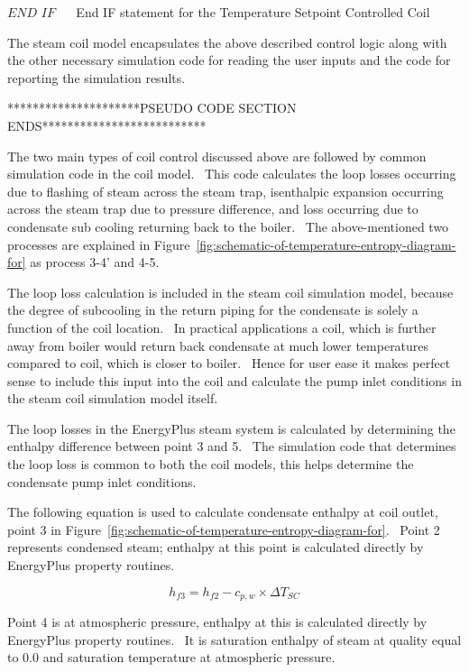 \(END\,\,IF\) ~~ End IF statement for the Temperature Setpoint Controlled Coil

The steam coil model encapsulates the above described control logic along with the other necessary simulation code for reading the user inputs and the code for reporting the simulation results.

*********************PSEUDO CODE SECTION ENDS**************************

The two main types of coil control discussed above are followed by common simulation code in the coil model.~ This code calculates the loop losses occurring due to flashing of steam across the steam trap, isenthalpic expansion occurring across the steam trap due to pressure difference, and loss occurring due to condensate sub cooling returning back to the boiler.~ The above-mentioned two processes are explained in Figure~\ref{fig:schematic-of-temperature-entropy-diagram-for} as process 3-4' and 4-5.

The loop loss calculation is included in the steam coil simulation model, because the degree of subcooling in the return piping for the condensate is solely a function of the coil location.~ In practical applications a coil, which is further away from boiler would return back condensate at much lower temperatures compared to coil, which is closer to boiler.~ Hence for user ease it makes perfect sense to include this input into the coil and calculate the pump inlet conditions in the steam coil simulation model itself.

The loop losses in the EnergyPlus steam system is calculated by determining the enthalpy difference between point 3 and 5.~ The simulation code that determines the loop loss is common to both the coil models, this helps determine the condensate pump inlet conditions.

The following equation is used to calculate condensate enthalpy at coil outlet, point 3 in Figure~\ref{fig:schematic-of-temperature-entropy-diagram-for}.~ Point 2 represents condensed steam; enthalpy at this point is calculated directly by EnergyPlus property routines.

\begin{equation}
{h_{f3}} = {h_{f2}} - {c_{p,w}} \times \Delta {T_{SC}}
\end{equation}

Point 4 is at atmospheric pressure, enthalpy at this is calculated directly by EnergyPlus property routines.~ It is saturation enthalpy of steam at quality equal to 0.0 and saturation temperature at atmospheric pressure.


